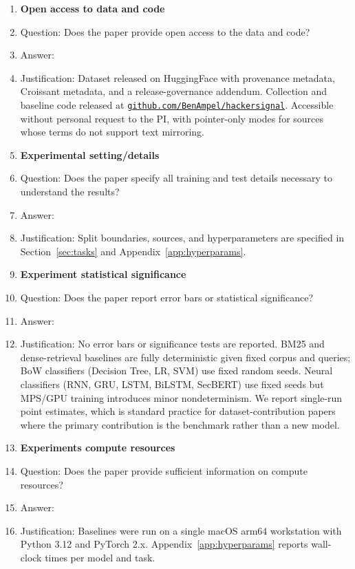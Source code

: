 \documentclass{article}
\begin{document}
\begin{enumerate}
\item {\bf Open access to data and code}
    \item[] Question: Does the paper provide open access to the data and code?
    \item[] Answer: \answerYes{}
    \item[] Justification: Dataset released on HuggingFace with provenance metadata, Croissant metadata, and a release-governance addendum. Collection and baseline code released at \href{https://github.com/BenAmpel/hackersignal}{\texttt{github.com/BenAmpel/hackersignal}}. Accessible without personal request to the PI, with pointer-only modes for sources whose terms do not support text mirroring.

\item {\bf Experimental setting/details}
    \item[] Question: Does the paper specify all training and test details necessary to understand the results?
    \item[] Answer: \answerYes{}
    \item[] Justification: Split boundaries, sources, and hyperparameters are specified in Section~\ref{sec:tasks} and Appendix~\ref{app:hyperparams}.

\item {\bf Experiment statistical significance}
    \item[] Question: Does the paper report error bars or statistical significance?
    \item[] Answer: \answerNo{}
    \item[] Justification: No error bars or significance tests are reported. BM25 and dense-retrieval baselines are fully deterministic given fixed corpus and queries; BoW classifiers (Decision Tree, LR, SVM) use fixed random seeds. Neural classifiers (RNN, GRU, LSTM, BiLSTM, SecBERT) use fixed seeds but MPS/GPU training introduces minor nondeterminism. We report single-run point estimates, which is standard practice for dataset-contribution papers where the primary contribution is the benchmark rather than a new model.

\item {\bf Experiments compute resources}
    \item[] Question: Does the paper provide sufficient information on compute resources?
    \item[] Answer: \answerYes{}
    \item[] Justification: Baselines were run on a single macOS arm64 workstation with Python 3.12 and PyTorch 2.x. Appendix~\ref{app:hyperparams} reports wall-clock times per model and task.


\end{enumerate}
\end{document}
